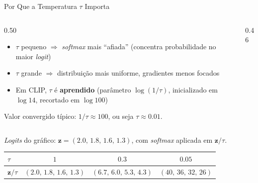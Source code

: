 \documentclass[aspectratio=169,xcolor=dvipsnames]{beamer}
\begin{document}
  \begin{frame}{Por Que a Temperatura $\tau$ Importa}
    \begin{columns}[T]
      \begin{column}{0.50\textwidth}
        \begin{itemize}
          \item $\tau$ pequeno $\Rightarrow$ \textit{softmax} mais ``afiada'' (concentra probabilidade no maior \textit{logit})
          \item $\tau$ grande $\Rightarrow$ distribuição mais uniforme, gradientes menos focados
          \item Em CLIP, $\tau$ é \textbf{aprendido} (parâmetro $\log(1/\tau)$, inicializado em $\log 14$, recortado em $\log 100$)
        \end{itemize}

        \vspace{0.3em}
        \footnotesize
        Valor convergido típico: $1/\tau \approx 100$, ou seja $\tau \approx 0.01$.
      \end{column}
      \begin{column}{0.46\textwidth}
        \centering
      \end{column}
    \end{columns}

    \vspace{0.5em}
    \centering
    \small
    \textit{Logits} do gráfico: $\mathbf{z} = (2.0,\, 1.8,\, 1.6,\, 1.3)$, com \textit{softmax} aplicada em $\mathbf{z}/\tau$.\\[0.3em]
    \begin{tabular}{@{}lccc@{}}
      \toprule
      $\tau$ & $1$ & $0.3$ & $0.05$ \\
      \midrule
      $\mathbf{z}/\tau$ & $(2.0,\, 1.8,\, 1.6,\, 1.3)$ & $(6.7,\, 6.0,\, 5.3,\, 4.3)$ & $(40,\, 36,\, 32,\, 26)$ \\
      \bottomrule
    \end{tabular}
  \end{frame}
\end{document}
